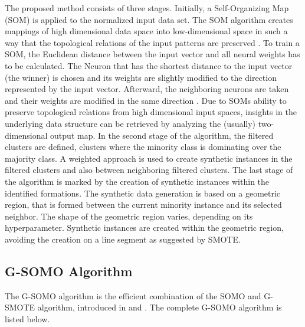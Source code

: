 \documentclass[parskip=full]{scrartcl}
\begin{document}
The proposed method consists of three stages. Initially, a Self-Organizing Map (SOM) is applied to the normalized
 input data set. The SOM algorithm creates mappings of high dimensional data space into low-dimensional 
 space in such a way that the topological relations of the input patterns are preserved \cite{KOKUER2007}. 
 To train a SOM, the Euclidean distance between the input vector and all neural weights has to be calculated. 
 The Neuron that has the shortest distance to the input vector (the winner) is chosen and its weights are 
 slightly modified to the direction represented by the input vector. Afterward, the neighboring neurons are 
 taken and their weights are modified in the same direction \cite{Brocki2007}. Due to SOMs ability to preserve 
 topological relations from high dimensional input spaces, insights in the underlying data structure can be 
 retrieved by analyzing the (usually) two-dimensional output map. In the second stage of the algorithm, the 
 filtered clusters are defined, clusters where the minority class is dominating over the majority class. A weighted 
 approach is used to create synthetic instances in the filtered clusters and also between neighboring filtered 
 clusters. The last stage of the algorithm is marked by the creation of synthetic instances within the 
 identified formations. The synthetic data generation is based on a geometric region, that is formed between the 
 current minority instance and its selected neighbor. The shape of the geometric region varies, depending on its 
 hyperparameter. Synthetic instances are created within the geometric region, avoiding the creation on a line 
 segment as suggested by SMOTE. 

\subsection{G-SOMO Algorithm}

The G-SOMO algorithm is the efficient combination of the SOMO and G-SMOTE algorithm, introduced in 
\cite{Douzas2017B} and \cite{Douzas2017}. The complete G-SOMO algorithm is listed below.
\end{document}
